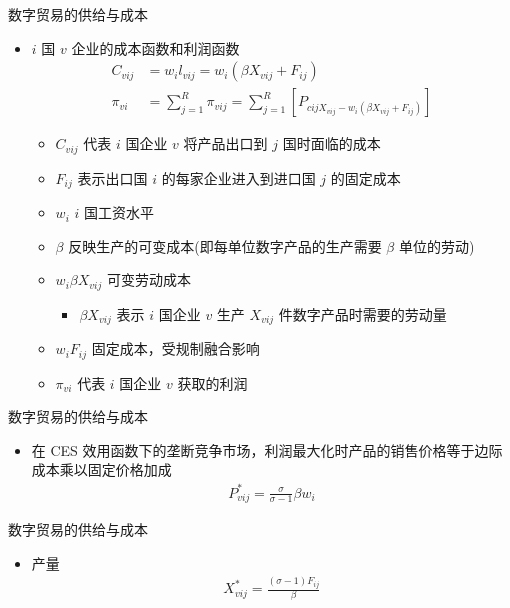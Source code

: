 \documentclass{beamer}
\begin{document}
\begin{frame}{数字贸易的供给与成本}
    \begin{itemize}
        \item $i$ 国 $v$ 企业的成本函数和利润函数
        \begin{align}
            C_{vij} &= w_i l_{vij} = w_i(\beta X_{vij} + F_{ij}) \tag{5} \\
            \pi_{vi} &= \sum_{j=1}^{R} \pi_{vij} = \sum_{j=1}^{R} [P_{cij X_{vij} - w_i(\beta X_{vij} + F_{ij})}] \tag{6}
        \end{align}
        \begin{itemize}
            \item $C_{vij}$ 代表 $i$ 国企业 $v$ 将产品出口到 $j$ 国时面临的成本
            \item $F_{ij}$ 表示出口国 $i$ 的每家企业进入到进口国 $j$ 的固定成本
            \item $w_i$ $i$ 国工资水平
            \item $\beta$ 反映生产的可变成本(即每单位数字产品的生产需要 $\beta$ 单位的劳动)
            \item $w_i \beta X_{vij}$ 可变劳动成本
            \begin{itemize} 
                \item $\beta X_{vij}$ 表示 $i$ 国企业 $v$ 生产 $X_{vij}$ 件数字产品时需要的劳动量
            \end{itemize}
            \item $w_i F_{ij}$ 固定成本，受规制融合影响
            \item $\pi_{vi}$ 代表 $i$ 国企业 $v$ 获取的利润
        \end{itemize}
    \end{itemize}
\end{frame}

\begin{frame}{数字贸易的供给与成本}
    \begin{itemize}
        \item 在 CES 效用函数下的垄断竞争市场，利润最大化时产品的销售价格等于边际成本乘以固定价格加成
        \begin{align}
            P_{vij}^{*} = \frac{\sigma}{\sigma - 1} \beta w_i \tag{7}
        \end{align}
    \end{itemize}
\end{frame}

\begin{frame}{数字贸易的供给与成本}
    \begin{itemize}
        \item 产量
        \begin{align}
            X_{vij}^{*} = \frac{(\sigma - 1) F_{ij}}{\beta} \tag{8}
        \end{align}
    \end{itemize}
\end{frame}
\end{document}
